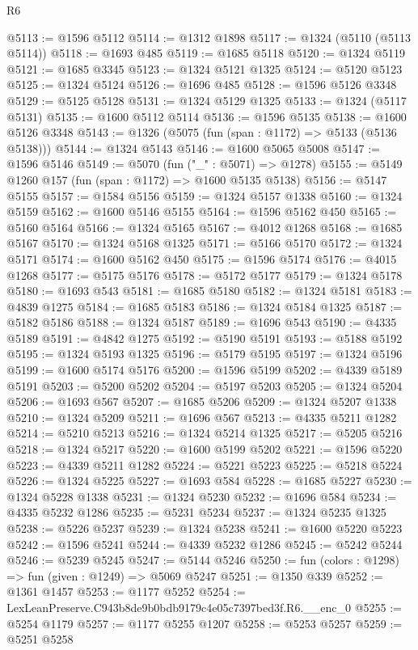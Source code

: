 \begin{lexlean}{R6}
\begin{coremodule}
@5113 := @1596 @5112
@5114 := @1312 @1898
@5117 := @1324 (@5110 (@5113 @5114))
@5118 := @1693 @485
@5119 := @1685 @5118
@5120 := @1324 @5119
@5121 := @1685 @3345
@5123 := @1324 @5121 @1325
@5124 := @5120 @5123
@5125 := @1324 @5124
@5126 := @1696 @485
@5128 := @1596 @5126 @3348
@5129 := @5125 @5128
@5131 := @1324 @5129 @1325
@5133 := @1324 (@5117 @5131)
@5135 := @1600 @5112 @5114
@5136 := @1596 @5135
@5138 := @1600 @5126 @3348
@5143 := @1326 (@5075 (fun (span : @1172) => @5133 (@5136 @5138)))
@5144 := @1324 @5143
@5146 := @1600 @5065 @5008
@5147 := @1596 @5146
@5149 := @5070 (fun ("_" : @5071) => @1278)
@5155 := @5149 @1260 @157 (fun (span : @1172) => @1600 @5135 @5138)
@5156 := @5147 @5155
@5157 := @1584 @5156
@5159 := @1324 @5157 @1338
@5160 := @1324 @5159
@5162 := @1600 @5146 @5155
@5164 := @1596 @5162 @450
@5165 := @5160 @5164
@5166 := @1324 @5165
@5167 := @4012 @1268
@5168 := @1685 @5167
@5170 := @1324 @5168 @1325
@5171 := @5166 @5170
@5172 := @1324 @5171
@5174 := @1600 @5162 @450
@5175 := @1596 @5174
@5176 := @4015 @1268
@5177 := @5175 @5176
@5178 := @5172 @5177
@5179 := @1324 @5178
@5180 := @1693 @543
@5181 := @1685 @5180
@5182 := @1324 @5181
@5183 := @4839 @1275
@5184 := @1685 @5183
@5186 := @1324 @5184 @1325
@5187 := @5182 @5186
@5188 := @1324 @5187
@5189 := @1696 @543
@5190 := @4335 @5189
@5191 := @4842 @1275
@5192 := @5190 @5191
@5193 := @5188 @5192
@5195 := @1324 @5193 @1325
@5196 := @5179 @5195
@5197 := @1324 @5196
@5199 := @1600 @5174 @5176
@5200 := @1596 @5199
@5202 := @4339 @5189 @5191
@5203 := @5200 @5202
@5204 := @5197 @5203
@5205 := @1324 @5204
@5206 := @1693 @567
@5207 := @1685 @5206
@5209 := @1324 @5207 @1338
@5210 := @1324 @5209
@5211 := @1696 @567
@5213 := @4335 @5211 @1282
@5214 := @5210 @5213
@5216 := @1324 @5214 @1325
@5217 := @5205 @5216
@5218 := @1324 @5217
@5220 := @1600 @5199 @5202
@5221 := @1596 @5220
@5223 := @4339 @5211 @1282
@5224 := @5221 @5223
@5225 := @5218 @5224
@5226 := @1324 @5225
@5227 := @1693 @584
@5228 := @1685 @5227
@5230 := @1324 @5228 @1338
@5231 := @1324 @5230
@5232 := @1696 @584
@5234 := @4335 @5232 @1286
@5235 := @5231 @5234
@5237 := @1324 @5235 @1325
@5238 := @5226 @5237
@5239 := @1324 @5238
@5241 := @1600 @5220 @5223
@5242 := @1596 @5241
@5244 := @4339 @5232 @1286
@5245 := @5242 @5244
@5246 := @5239 @5245
@5247 := @5144 @5246
@5250 := fun (colors : @1298) => fun (given : @1249) => @5069 @5247
@5251 := @1350 @339
@5252 := @1361 @1457
@5253 := @1177 @5252
@5254 := LexLeanPreserve.C943b8de9b0bdb9179c4e05c7397bed3f.R6.__enc_0
@5255 := @5254 @1179
@5257 := @1177 @5255 @1207
@5258 := @5253 @5257
@5259 := @5251 @5258

\end{coremodule}
\end{lexlean}
